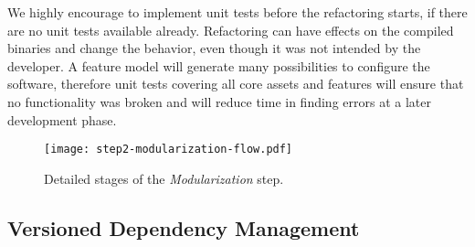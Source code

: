 We highly encourage to implement unit tests before the refactoring starts, if
there are no unit tests available already. Refactoring can have effects on the
compiled binaries and change the behavior, even though it was not intended by
the developer. A feature model will generate many possibilities to configure the
software, therefore unit tests covering all core assets and features will ensure
that no functionality was broken and will reduce time in finding errors at a
later development phase.

\begin{figure}[htb]
  \centering
  \texttt{[image: step2-modularization-flow.pdf]}
  \caption{Detailed stages of the \textit{Modularization} step.}
  \label{fig:step2Modularization}
\end{figure}

\subsection{Versioned Dependency Management}\label{dependencies}

